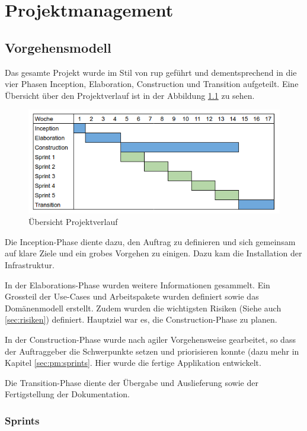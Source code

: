 
\chapter{Projektmanagement}

\section{Vorgehensmodell}

Das gesamte Projekt wurde im Stil von \gls{rup} geführt und dementsprechend in die vier Phasen Inception, Elaboration, Construction und Transition aufgeteilt. Eine Übersicht über den Projektverlauf ist in der Abbildung \ref{fig:pm:project_overview} zu sehen.

\begin{figure}[H]
	\centering
	\includegraphics[width=0.8\linewidth]{fig/project_overview}
	\caption{Übersicht Projektverlauf}
	\label{fig:pm:project_overview}
\end{figure}

Die Inception-Phase diente dazu, den Auftrag zu definieren und sich gemeinsam auf klare Ziele und ein grobes Vorgehen zu einigen. Dazu kam die Installation der Infrastruktur.

In der Elaborations-Phase wurden weitere Informationen gesammelt. Ein Grossteil der Use-Cases und Arbeitspakete wurden definiert sowie das Domänenmodell erstellt. Zudem wurden die wichtigsten Risiken (Siehe auch \ref{sec:risiken}) definiert. Hauptziel war es, die Construction-Phase zu planen.

In der Construction-Phase wurde nach agiler Vorgehensweise gearbeitet, so dass der Auftraggeber die Schwerpunkte setzen und priorisieren konnte (dazu mehr in Kapitel \ref{sec:pm:sprints}. Hier wurde die fertige Applikation entwickelt.

Die Transition-Phase diente der Übergabe und Auslieferung sowie der Fertigstellung der Dokumentation.


\subsection*{Sprints} \label{sec:pm:sprints}


